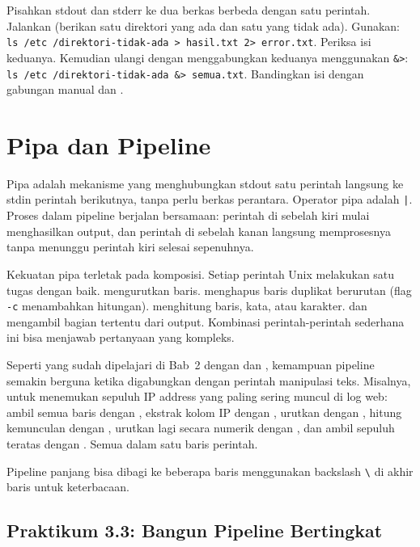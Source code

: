 \begin{challengebox}
Pisahkan stdout dan stderr ke dua berkas berbeda dengan satu perintah. Jalankan  (berikan satu direktori yang ada dan satu yang tidak ada). Gunakan: \texttt{ls /etc /direktori-tidak-ada > hasil.txt 2> error.txt}. Periksa isi keduanya. Kemudian ulangi dengan menggabungkan keduanya menggunakan \texttt{\&>}: \texttt{ls /etc /direktori-tidak-ada \&> semua.txt}. Bandingkan isi  dengan gabungan manual  dan .
\end{challengebox}

\section{Pipa dan Pipeline}
\label{sec:pipes}

Pipa adalah mekanisme yang menghubungkan stdout satu perintah langsung ke stdin perintah berikutnya, tanpa perlu berkas perantara. Operator pipa adalah \texttt{|}. Proses dalam pipeline berjalan bersamaan: perintah di sebelah kiri mulai menghasilkan output, dan perintah di sebelah kanan langsung memprosesnya tanpa menunggu perintah kiri selesai sepenuhnya.

Kekuatan pipa terletak pada komposisi. Setiap perintah Unix melakukan satu tugas dengan baik.  mengurutkan baris.  menghapus baris duplikat berurutan (flag \texttt{-c} menambahkan hitungan).  menghitung baris, kata, atau karakter.  dan  mengambil bagian tertentu dari output. Kombinasi perintah-perintah sederhana ini bisa menjawab pertanyaan yang kompleks.

Seperti yang sudah dipelajari di Bab~2 dengan  dan , kemampuan pipeline semakin berguna ketika digabungkan dengan perintah manipulasi teks. Misalnya, untuk menemukan sepuluh IP address yang paling sering muncul di log web: ambil semua baris dengan , ekstrak kolom IP dengan , urutkan dengan , hitung kemunculan dengan , urutkan lagi secara numerik dengan , dan ambil sepuluh teratas dengan . Semua dalam satu baris perintah.

Pipeline panjang bisa dibagi ke beberapa baris menggunakan backslash \texttt{\textbackslash} di akhir baris untuk keterbacaan.

\subsection*{Praktikum 3.3: Bangun Pipeline Bertingkat}

